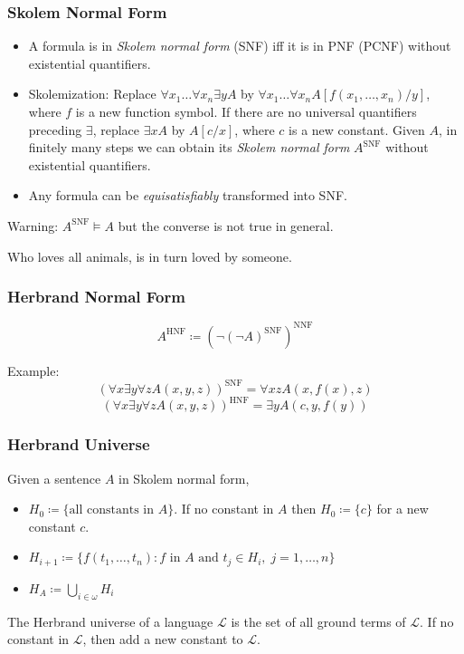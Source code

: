 \documentclass[UTF8,11pt,colorlinks,compress,openany]{beamer}%
\begin{document}
\begin{frame}\frametitle{Skolem Normal Form}
	\begin{itemize}
		\item A formula is in \emph{Skolem normal form} (SNF) iff it is in PNF (PCNF) without existential quantifiers. 
		\item Skolemization: Replace $\forall x_1\dots\forall x_n\exists y A$ by $\forall x_1\dots\forall x_n A[f(x_1,\dots,x_n)/y]$, where $f$ is a new function symbol. If there are no universal quantifiers preceding $\exists$, replace $\exists x A$ by $A[c/x]$, where $c$ is a new constant. Given $A$, in finitely many steps we can obtain its \emph{Skolem normal form} $A^{\mathrm{SNF}}$ without existential quantifiers.
		\item Any formula can be \emph{equisatisfiably} transformed into SNF.
	\end{itemize}
	Warning: $A^{\mathrm{SNF}}\vDash A$ but the converse is not true in general.
	\begin{exercise}
	Who loves all animals, is in turn loved by someone.
	\end{exercise}
\end{frame}

\begin{frame}\frametitle{Herbrand Normal Form}
	\begin{center}
		\[A^{\mathrm{HNF}}\coloneqq \left(\neg(\neg A)^{\mathrm{SNF}}\right)^{\mathrm{NNF}}\]
	\end{center}
	Example:
	\[(\forall x\exists y\forall z A(x,y,z))^{\mathrm{SNF}}=\forall xz A(x,f(x),z)\]
	\[(\forall x\exists y\forall z A(x,y,z))^{\mathrm{HNF}}=\exists y A(c,y,f(y))\]
\end{frame}

\begin{frame}\frametitle{Herbrand Universe}
\begin{definition}
Given a sentence $A$ in Skolem normal form,
\begin{itemize}
	\item $H_0\coloneqq \{\mbox{all constants in } A\}$. If no constant in $A$ then $H_0\coloneqq \{c\}$ for a new constant $c$.
	\item $H_{i+1}\coloneqq \big\{f(t_1,\dots,t_n): f \mbox{ in } A \mbox{ and } t_j\in H_i,\; j=1,\dots, n\big\}$
	\item $H_A\coloneqq \bigcup\limits_{i\in\omega}H_i$
\end{itemize}
\end{definition}
The Herbrand universe of a language $\mathscr{L}$ is the set of all ground terms of $\mathscr{L}$. If no constant in $\mathscr{L}$, then add a new constant to $\mathscr{L}$.
\end{frame}
\end{document}

